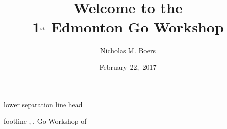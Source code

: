 \title[Welcome]{Welcome to the\\[0.25em]
  1$^{\tiny{}\rm{st}}$ Edmonton Go Workshop}
\author[N. M. Boers]{Nicholas M. Boers}
\date{February~22,~2017}
\def\inserteventshort{Go Workshop}
\def\insertevent{Go Workshop}

\newlength{\logowidth}
\setlength{\logowidth}{1.7cm}
\newlength{\navwidth}
\setlength{\navwidth}{\paperwidth}
\addtolength{\navwidth}{-\logowidth}
\addtolength{\navwidth}{-3pt}
\addtolength{\logowidth}{-3pt}
{%
  \vskip2pt\nobreak%
  \begin{minipage}{\navwidth}%
    \fontsize{8pt}{9.2}\selectfont{}%
    \insertnavigation{\navwidth}%
  \end{minipage}%
  \nobreak\nobreak%
  \linebreak[0]\vskip4pt%
  \begin{beamercolorbox}[colsep=1.5pt]{lower separation line head}
  \end{beamercolorbox}
}

{%
  \leavevmode%
  \begin{beamercolorbox}{footline}%
    \vskip2pt\hspace{2mm}%
    \insertshorttitle, \insertshortauthor, \insertevent%
    \hfill%
    \insertframenumber\/ of \inserttotalframenumber%
    \kern2mm\vskip2pt%
  \end{beamercolorbox}%
}

